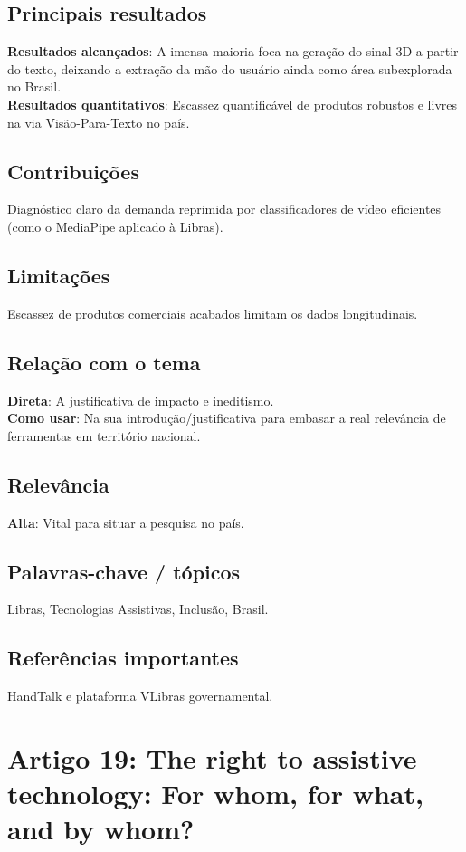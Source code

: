 \documentclass[12pt, a4paper]{article}
\begin{document}
\subsection{Principais resultados}
\textbf{Resultados alcançados}: A imensa maioria foca na geração do sinal 3D a partir do texto, deixando a extração da mão do usuário ainda como área subexplorada no Brasil.\\
\textbf{Resultados quantitativos}: Escassez quantificável de produtos robustos e livres na via Visão-Para-Texto no país.\\
\subsection{Contribuições}
Diagnóstico claro da demanda reprimida por classificadores de vídeo eficientes (como o MediaPipe aplicado à Libras).\\
\subsection{Limitações}
Escassez de produtos comerciais acabados limitam os dados longitudinais.\\
\subsection{Relação com o tema}
\textbf{Direta}: A justificativa de impacto e ineditismo.\\
\textbf{Como usar}: Na sua introdução/justificativa para embasar a real relevância de ferramentas em território nacional.\\
\subsection{Relevância}
\textbf{Alta}: Vital para situar a pesquisa no país.\\
\subsection{Palavras-chave / tópicos}
Libras, Tecnologias Assistivas, Inclusão, Brasil.\\
\subsection{Referências importantes}
HandTalk e plataforma VLibras governamental.
\newpage

\section{Artigo 19: The right to assistive technology: For whom, for what, and by whom?}
\end{document}

